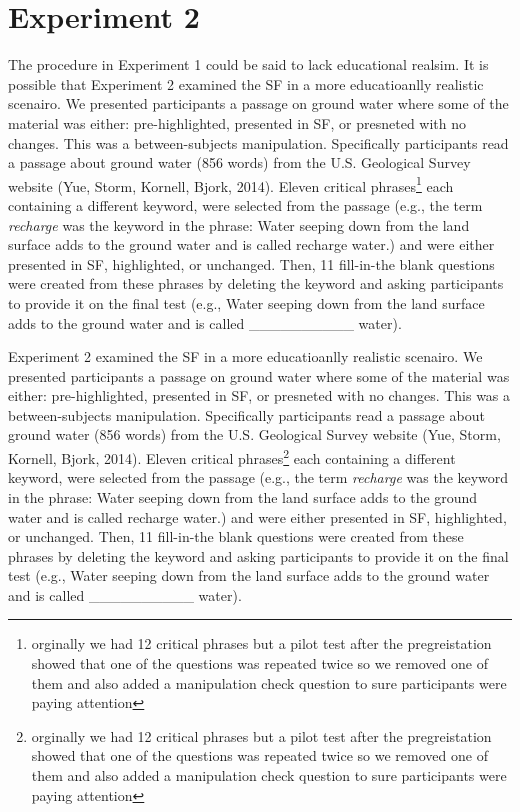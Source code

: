 \documentclass[doc]{apa6}
\begin{document}
\hypertarget{experiment-2}{%
\section{Experiment 2}\label{experiment-2}}

The procedure in Experiment 1 could be said to lack educational realsim. It is possible that Experiment 2 examined the SF in a more educatioanlly realistic scenairo. We presented participants a passage on ground water where some of the material was either: pre-highlighted, presented in SF, or presneted with no changes. This was a between-subjects manipulation. Specifically participants read a passage about ground water (856 words) from the U.S. Geological Survey website (Yue, Storm, Kornell, Bjork, 2014). Eleven critical phrases\footnote{orginally we had 12 critical phrases but a pilot test after the pregreistation showed that one of the questions was repeated twice so we removed one of them and also added a manipulation check question to sure participants were paying attention} each containing a different keyword, were selected from the passage (e.g., the term \emph{recharge} was the keyword in the phrase: Water seeping down from the land surface adds to the ground water and is called recharge water.) and were either presented in SF, highlighted, or unchanged. Then, 11 fill-in-the blank questions were created from these phrases by deleting the keyword and asking participants to provide it on the final test (e.g., Water seeping down from the land surface adds to the ground water and is called \_\_\_\_\_\_\_\_\_\_ water).

Experiment 2 examined the SF in a more educatioanlly realistic scenairo. We presented participants a passage on ground water where some of the material was either: pre-highlighted, presented in SF, or presneted with no changes. This was a between-subjects manipulation. Specifically participants read a passage about ground water (856 words) from the U.S. Geological Survey website (Yue, Storm, Kornell, Bjork, 2014). Eleven critical phrases\footnote{orginally we had 12 critical phrases but a pilot test after the pregreistation showed that one of the questions was repeated twice so we removed one of them and also added a manipulation check question to sure participants were paying attention} each containing a different keyword, were selected from the passage (e.g., the term \emph{recharge} was the keyword in the phrase: Water seeping down from the land surface adds to the ground water and is called recharge water.) and were either presented in SF, highlighted, or unchanged. Then, 11 fill-in-the blank questions were created from these phrases by deleting the keyword and asking participants to provide it on the final test (e.g., Water seeping down from the land surface adds to the ground water and is called \_\_\_\_\_\_\_\_\_\_ water).
\end{document}
